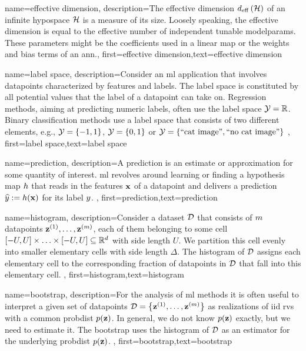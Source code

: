 {name={effective dimension},
	description={The effective dimension $d_{\rm eff} \left( \mathcal{H} \right)$ of 
		an infinite \gls{hypospace} $\mathcal{H}$ is a measure of its size. Loosely speaking, the 
		effective dimension is equal to the effective number of independent tunable \gls{modelparams}. 
		These parameters might be the coefficients used in a linear map or the 
		weights and bias terms of an \gls{ann}.},
	first={effective dimension},text={effective dimension}  
}

{name={label space},
	description={Consider an \gls{ml} application that involves \gls{datapoint}s characterized by features 
		and labels. The \gls{label} space is constituted by all potential values that the \gls{label} 
		of a \gls{datapoint} can take on. Regression methods, aiming at predicting numeric \gls{label}s, often
		 use the \gls{label} space $\mathcal{Y} = \mathbb{R}$. Binary \gls{classification} methods use a label space 
 		that consists of two different elements, e.g., $\mathcal{Y} =\{-1,1\}$, $\mathcal{Y}=\{0,1\}$ 
		or $\mathcal{Y} = \{ \mbox{``cat image''}, \mbox{``no cat image''} \}$  }, first={label space},text={label space}  
}

{name={prediction},
	description={A prediction is an estimate or approximation for some 
		quantity of interest. \Gls{ml} revolves around learning or finding a \gls{hypothesis} map $h$ 
		that reads in the \gls{feature}s ${\bf x}$ of a \gls{datapoint} and delivers a \gls{prediction} 
		$\widehat{y} := h({\bf x})$ for its \gls{label} $y$. },
	first={prediction},text={prediction}  
}


{name={histogram},
	description={Consider a \gls{dataset} $\mathcal{D}$ that consists of $m$ \gls{datapoint}s 
		${\bf z}^{(1)},\ldots,{\bf z}^{(m)}$, each of them belonging to some 
		cell $[-U,U] \times \ldots \times [-U,U] \subseteq \mathbb{R}^{d}$ with side 
		length $U$. We partition this cell evenly into smaller elementary cells with side 
		length $\Delta$. The histogram of $\mathcal{D}$ assigns each elementary cell to 
		the corresponding fraction of \gls{datapoint}s in $\mathcal{D}$ that fall into this 
		elementary cell. 
	},
	first={histogram},text={histogram}  
}

{name={bootstrap},
	description={For  the analysis of \gls{ml} methods it is often useful to interpret 
		a given set of \gls{datapoint}s $\mathcal{D} = \big\{ {\bf z}^{(1)},\ldots,{\bf z}^{(m)}\big\}$ 
		as \gls{realization}s of \gls{iid} \gls{rv}s with a common \gls{probdist} $p({\bf z})$. In general, we 
		do not know $p({\bf z})$ exactly, but we need to estimate it. The bootstrap uses the 
		histogram of $\mathcal{D}$ as an estimator for the underlying \gls{probdist} $p({\bf z})$. 
	},
	first={bootstrap},text={bootstrap}  
}

